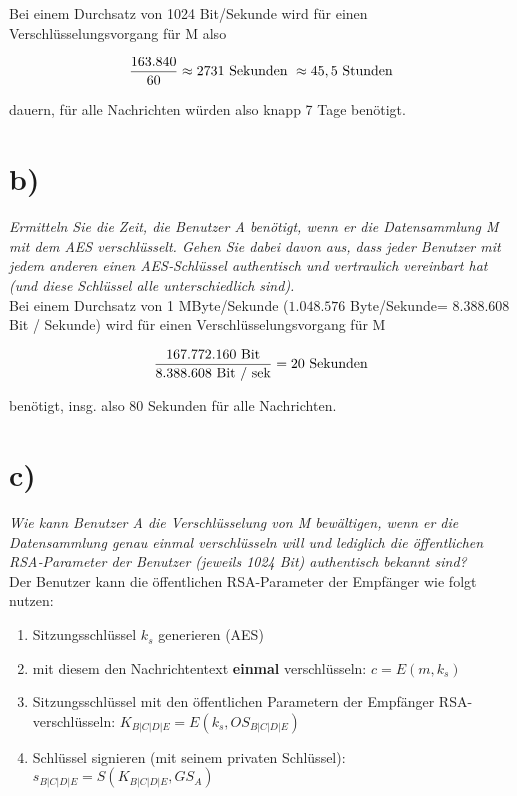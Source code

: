 \noindent
Bei einem Durchsatz von 1024 Bit/Sekunde wird für einen Verschlüsselungsvorgang für M also

\begin{equation}\notag
\frac{163.840}{60} \approx 2731\ \text{Sekunden}\ \approx 45,5 \ \text{Stunden}
\end{equation}

\noindent
dauern, für alle Nachrichten würden also knapp 7 Tage benötigt.

\section{b)}
\textit{Ermitteln Sie die Zeit, die Benutzer A benötigt, wenn er die Datensammlung M
mit dem AES verschlüsselt. Gehen Sie dabei davon aus, dass jeder Benutzer mit
jedem anderen einen AES‐Schlüssel authentisch und vertraulich vereinbart hat
(und diese Schlüssel alle unterschiedlich sind).}\\

\noindent
Bei einem Durchsatz von 1 MByte/Sekunde ($1.048.576$ Byte/Sekunde= $8.388.608$ Bit / Sekunde) wird für einen Verschlüsselungsvorgang für M

\begin{equation}\notag
\frac{167.772.160\ \text{Bit}}{8.388.608\ \text{Bit / sek}} = 20\ \text{Sekunden}
\end{equation}

\vspace{2mm}

\noindent
benötigt, insg. also 80 Sekunden für alle Nachrichten.

\section{c)}

\textit{Wie kann Benutzer A die Verschlüsselung von M bewältigen, wenn er die Datensammlung genau einmal verschlüsseln will und lediglich die öffentlichen RSA‐Parameter der Benutzer (jeweils 1024 Bit) authentisch bekannt sind?}\\

\noindent
Der Benutzer kann die öffentlichen RSA-Parameter der Empfänger wie folgt nutzen:

\begin{enumerate}
    \itemsep0.5em
    \item Sitzungsschlüssel $k_s$ generieren (AES)
    \item mit diesem den Nachrichtentext \textbf{einmal} verschlüsseln: $c = E(m, k_s)$
    \item Sitzungsschlüssel mit den öffentlichen Parametern der Empfänger RSA-verschlüsseln: $K_{B|C|D|E}=E(k_s, OS_{B|C|D|E})$
    \item Schlüssel signieren (mit seinem privaten Schlüssel): $s_{B|C|D|E} = S(K_{B|C|D|E}, GS_{A})$
\end{enumerate}

